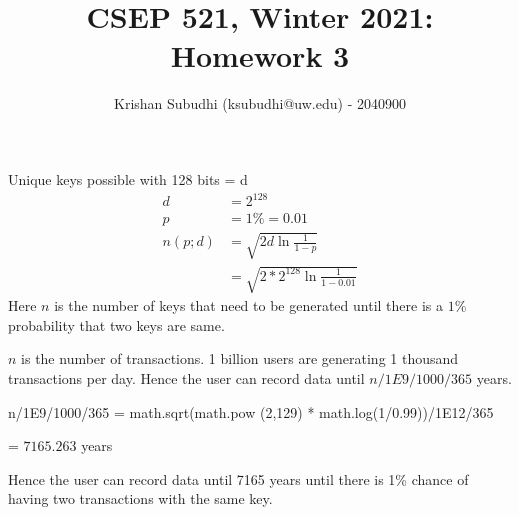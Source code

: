 \documentclass{homeworg}
\title{CSEP 521, Winter 2021: Homework 3}
\author{Krishan Subudhi (ksubudhi@uw.edu) - 2040900}
\begin{document}
\maketitle

\exercise
Unique keys possible with 128 bits = d
\begin{align*}
d &=  2^{128}\\
p &= 1\% =0.01\\
n(p;d) &= \sqrt{2d \ln{\frac{1}{1-p}}}\\
& = \sqrt{2 \ast 2^{128} \ln{\frac{1}{1-0.01}}}
\end{align*}
Here $n$ is the number of keys that need to be generated until there is a $1\%$ probability that two keys are same. 

$n$ is the number of transactions. 1 billion users are generating 1 thousand transactions per day. Hence the user can record data until $n/1E9/1000/365$ years.

\begin{python}
n/1E9/1000/365 = math.sqrt(math.pow (2,129) * math.log(1/0.99))/1E12/365
\end{python}
 = $7165.263$ years
 
Hence the user can record data until 7165 years until there is 1\% chance of having two transactions with the same key.
\newpage
\end{document}
